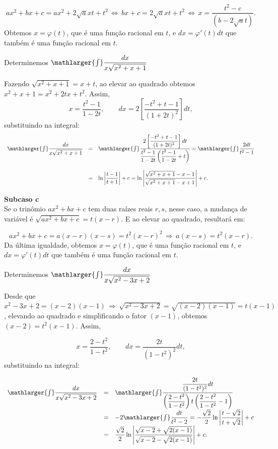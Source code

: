 \cleardoublepage\documentclass[../main.tex]{subfiles}
\begin{document}
\[ ax^2+bx+c=ax^2 +2\sqrt{a}xt +t^2\,\Leftrightarrow\, bx+c=2\sqrt{a}xt +t^2\,\Leftrightarrow\,x=\dfrac{ t^2-c}{ (b-2\sqrt{a}t)}. \]
Obtemos \(x=\varphi(t)\), que é uma função racional em \(t\), e \(dx=\varphi'(t) dt\) que também é uma função racional em \(t\).

\begin{ex}
Determinemos \(\mathlarger{\int} \dfrac{dx}{x\sqrt{x^2+x+1}}\)

\begin{solution}
Fazendo \(\sqrt{x^2+x+1}=x+t\), ao elevar ao quadrado obtemos \(x^2+x+1=x^2+2tx+t^2\). Assim,
\[ x=\dfrac{t^2-1}{1-2t},\qquad dx=2\left[\dfrac{-t^2+t-1}{(1+2t)^2}\right]dt, \]
substituindo na integral:
\[ \begin{array}{rcl} \mathlarger{\int} \dfrac{dx}{x\sqrt{x^2+x+1}} &=& \mathlarger{\int} \dfrac{2\left[\dfrac{-t^2+t-1}{(1+2t)^2}\right]dt}{\dfrac{t^2-1}{1-2t}\left(\dfrac{t^2-1}{1-2t}+t\right)} = \mathlarger{\int} \dfrac{2dt}{t^2-1} \\ \\ &=& \ln\left|\dfrac{t-1}{t+1}\right|+c = \ln \left|\dfrac{\sqrt{x^2+x+1} -x-1}{\sqrt{x^2+x+1} -x+1} \right|+c. \end{array} \]
\end{solution}
\end{ex}

\textbf{Subcaso c}\\
Se o trinômio \(ax^2+bx+c\) tem duas raízes reais \(r, s\), nesse caso, a mudança de variável é \(\sqrt{ax^2+bx+c}=t(x-r)\). E ao elevar ao quadrado, resultará em:

\[ ax^2+bx+c=a(x-r)(x-s)= t^2(x-r)^2\,\Rightarrow\, a(x-s)=t^2(x-r). \]
Da última igualdade, obtemos \(x=\varphi(t)\), que é uma função racional em \(t\), e \(dx=\varphi'(t) dt\) que também é uma função racional em \(t\).
\begin{ex}
Determinemos \(\mathlarger{\int} \dfrac{dx}{x\sqrt{x^2-3x+2}}\)

\begin{solution}
Desde que \(x^2-3x+2=(x-2)(x-1)\,\Rightarrow\,\sqrt{x^2-3x+2}=\sqrt{(x-2)(x-1)}=t(x-1)\), elevando ao quadrado e simplificando o fator \((x-1)\), obtemos \((x-2)=t^2(x-1)\). Assim,

\[ x=\dfrac{2-t^2}{1-t^2},\qquad dx=\dfrac{2t}{(1-t^2)^2}dt, \]
substituindo na integral:

\[ \begin{array}{rcl} \mathlarger{\int} \dfrac{dx}{x\sqrt{x^2-3x+2}} &=& \mathlarger{\int} \dfrac{\dfrac{2t}{(1-t^2)^2}dt}{\left(\dfrac{2-t^2}{1-t^2}\right) t\left(\dfrac{2-t^2}{1-t^2} -1\right)}\\ &=& -2\mathlarger{\int} \dfrac{dt}{t^2-2} = -\dfrac{\sqrt{2}}{2}\ln\left|\dfrac{t-\sqrt{2}}{t+\sqrt{2}}\right|+c\\ &=& \dfrac{\sqrt{2}}{2} \ln \left|\dfrac{\sqrt{x-2} +\sqrt{2(x-1)}}{\sqrt{x-2} -\sqrt{2(x-1)}} \right|+c. \end{array} \]
\end{solution}
\end{ex}
\end{document}
